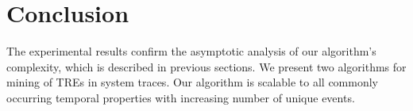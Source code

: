 \documentclass[]{sigplanconf}
\begin{document}






\section{Conclusion}

The experimental results confirm the asymptotic analysis of our algorithm's complexity, which is described in previous sections. We present two algorithms for mining of TREs in system traces. Our algorithm is scalable to all commonly occurring temporal properties with increasing number of unique events.


%


\end{document}
